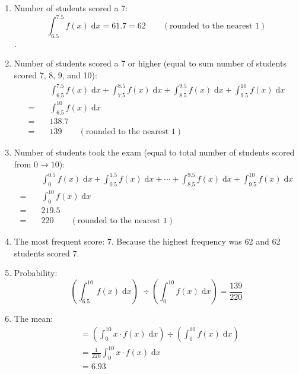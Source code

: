 \documentclass[12pt]{article}
\begin{document}
    \begin{enumerate}
        \item Number of students scored a 7: $$\int_{6.5}^{7.5} f(x)\;\mathrm{d}x = 61.7=62
        \qquad (\text{rounded to the nearest 1})$$. \par

        \item Number of students scored a 7 or higher (equal to sum number of students scored 7, 8, 9, and 10): 
        \begin{align*}
        &\int_{6.5}^{7.5} f(x)\;\mathrm{d}x 
        + \int_{7.5}^{8.5} f(x)\;\mathrm{d}x
        + \int_{8.5}^{9.5} f(x)\;\mathrm{d}x
        + \int_{9.5}^{10} f(x)\;\mathrm{d}x \\
        =\quad& \int_{6.5}^{10} f(x)\;\mathrm{d}x \\
        =\quad& 138.7 \\
        =\quad& 139 \qquad (\text{rounded to the nearest 1})
        \end{align*}

        \item Number of students took the exam (equal to total number of students scored from $0\to 10$):
        \begin{align*}
            &\int_{0}^{0.5} f(x)\;\mathrm{d}x 
            + \int_{0.5}^{1.5} f(x)\;\mathrm{d}x 
            +\cdots
            + \int_{8.5}^{9.5} f(x)\;\mathrm{d}x
            + \int_{9.5}^{10} f(x)\;\mathrm{d}x \\
            =\quad&\int_{0}^{10} f(x)\;\mathrm{d}x \\
            =\quad& 219.5 \\
            =\quad& 220 \qquad (\text{rounded to the nearest 1})
        \end{align*}
        
        
        \item The most frequent score: 7. Because the highest frequency was 62 and 62 students scored 7.
        
        \item Probability:
        $$\left(\int_{6.5}^{10} f(x)\;\mathrm{d}x \right) 
        \;\div 
        \left(\int_{0}^{10} f(x)\;\mathrm{d}x \right)
        = \frac{139}{220}$$

        
        \item The mean:
        \begin{align*}
            &=\left( \int_0^{10}x\cdot f(x) \;\mathrm{d} x\right)
            \div
            \left(\int_0^{10} f(x) \;\mathrm{d}x \right) \\
            &= \frac{1}{220} \int_0^{10}x\cdot f(x) \;\mathrm{d}x \\
            &= 6.93
        \end{align*}
        


\end{enumerate}
\end{document}
